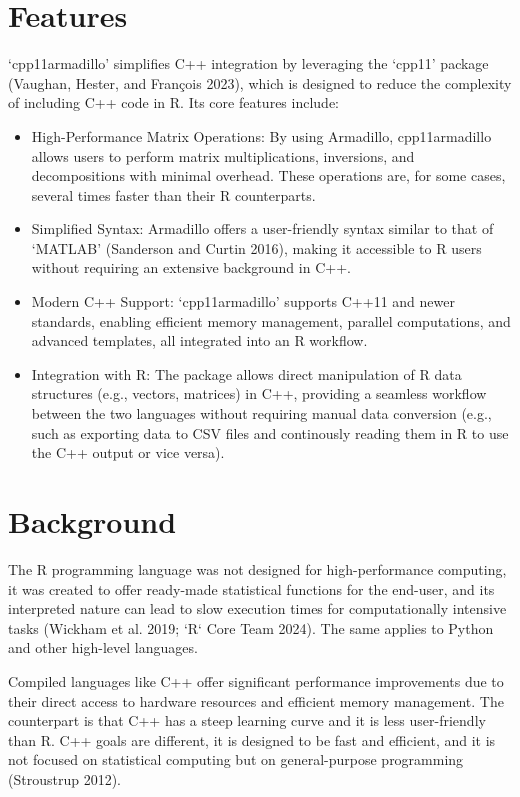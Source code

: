 \documentclass[preprint,12pt]{elsarticle}
\begin{document}
\section{Features}\label{features}

`cpp11armadillo' simplifies C++ integration by leveraging the `cpp11'
package (Vaughan, Hester, and François 2023), which is designed to
reduce the complexity of including C++ code in R. Its core features
include:

\begin{itemize}
\item
  High-Performance Matrix Operations: By using Armadillo, cpp11armadillo
  allows users to perform matrix multiplications, inversions, and
  decompositions with minimal overhead. These operations are, for some
  cases, several times faster than their R counterparts.
\item
  Simplified Syntax: Armadillo offers a user-friendly syntax similar to
  that of `MATLAB' (Sanderson and Curtin 2016), making it accessible to
  R users without requiring an extensive background in C++.
\item
  Modern C++ Support: `cpp11armadillo' supports C++11 and newer
  standards, enabling efficient memory management, parallel
  computations, and advanced templates, all integrated into an R
  workflow.
\item
  Integration with R: The package allows direct manipulation of R data
  structures (e.g., vectors, matrices) in C++, providing a seamless
  workflow between the two languages without requiring manual data
  conversion (e.g., such as exporting data to CSV files and continously
  reading them in R to use the C++ output or vice versa).
\end{itemize}

\section{Background}\label{background}

The R programming language was not designed for high-performance
computing, it was created to offer ready-made statistical functions for
the end-user, and its interpreted nature can lead to slow execution
times for computationally intensive tasks (Wickham et al. 2019; `R` Core
Team 2024). The same applies to Python and other high-level languages.

Compiled languages like C++ offer significant performance improvements
due to their direct access to hardware resources and efficient memory
management. The counterpart is that C++ has a steep learning curve and
it is less user-friendly than R. C++ goals are different, it is designed
to be fast and efficient, and it is not focused on statistical computing
but on general-purpose programming (Stroustrup 2012).
\end{document}
